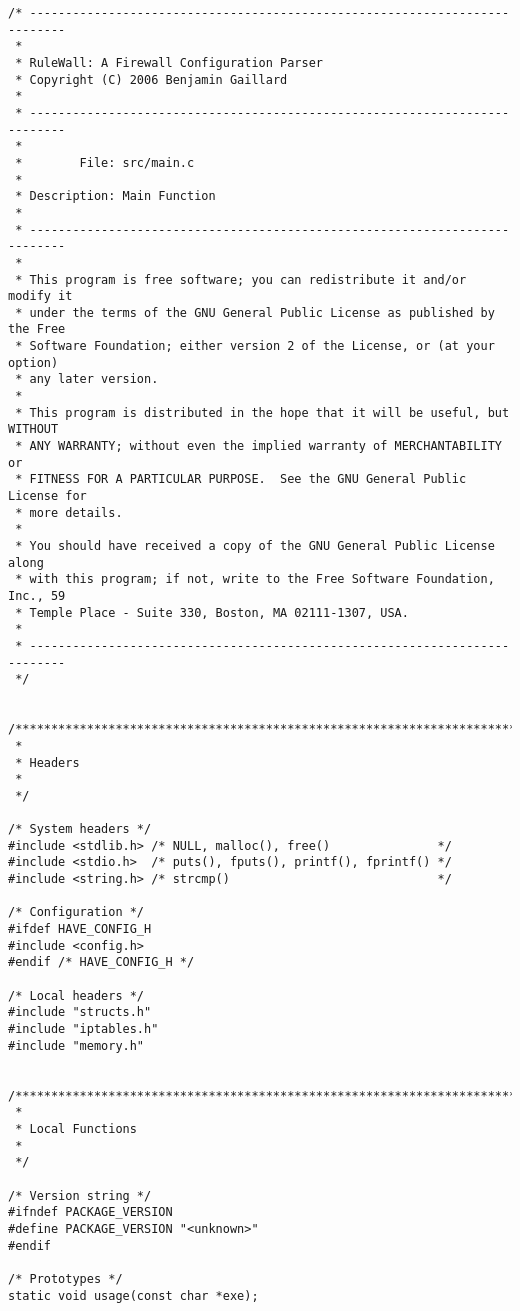 \documentclass[a4paper,landscape,twocolumn,11pt]{article}
\begin{document}
\begin{lstlisting}
/* ---------------------------------------------------------------------------
 *
 * RuleWall: A Firewall Configuration Parser
 * Copyright (C) 2006 Benjamin Gaillard
 *
 * ---------------------------------------------------------------------------
 *
 *        File: src/main.c
 *
 * Description: Main Function
 *
 * ---------------------------------------------------------------------------
 *
 * This program is free software; you can redistribute it and/or modify it
 * under the terms of the GNU General Public License as published by the Free
 * Software Foundation; either version 2 of the License, or (at your option)
 * any later version.
 *
 * This program is distributed in the hope that it will be useful, but WITHOUT
 * ANY WARRANTY; without even the implied warranty of MERCHANTABILITY or
 * FITNESS FOR A PARTICULAR PURPOSE.  See the GNU General Public License for
 * more details.
 *
 * You should have received a copy of the GNU General Public License along
 * with this program; if not, write to the Free Software Foundation, Inc., 59
 * Temple Place - Suite 330, Boston, MA 02111-1307, USA.
 *
 * ---------------------------------------------------------------------------
 */


/*****************************************************************************
 *
 * Headers
 *
 */

/* System headers */
#include <stdlib.h> /* NULL, malloc(), free()               */
#include <stdio.h>  /* puts(), fputs(), printf(), fprintf() */
#include <string.h> /* strcmp()                             */

/* Configuration */
#ifdef HAVE_CONFIG_H
#include <config.h>
#endif /* HAVE_CONFIG_H */

/* Local headers */
#include "structs.h"
#include "iptables.h"
#include "memory.h"


/*****************************************************************************
 *
 * Local Functions
 *
 */

/* Version string */
#ifndef PACKAGE_VERSION
#define PACKAGE_VERSION "<unknown>"
#endif

/* Prototypes */
static void usage(const char *exe);


\end{lstlisting}
\end{document}
